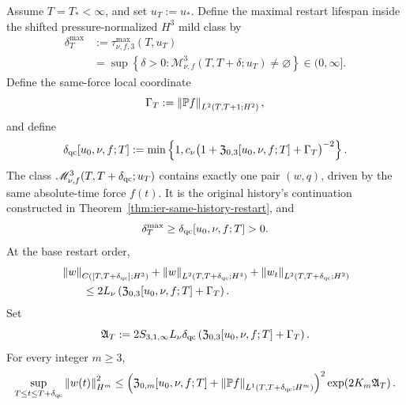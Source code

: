 \begin{theorem}
\label{thm:qc-restart}
Assume \(T=T_*<\infty\), and set \(u_T:=u_*\).
Define the maximal restart lifespan inside the shifted pressure-normalized
\(H^3\) mild class by
\begin{equation}
 \begin{aligned}
 \delta_T^{\max}
 &:=\tau_{\nu,f,3}^{\max}(T,u_T)\\
 &=\sup\left\{\delta>0:
 \mathscr M_{\nu,f}^3(T,T+\delta;u_T)\ne\varnothing\right\}
 \in(0,\infty].
 \end{aligned}
 \label{eq:qc-maximal-restart-lifespan-definition}
\end{equation}
Define the same-force local coordinate
\[
 \Gamma_T:=\left\lVert \mathbb P f\right\rVert_{L^2(T,T+1;H^2)},
\]
and define
\begin{equation}
 \delta_{\rm qc}[u_0,\nu,f;T]
 :=\min\left\{
 1,
 c_\nu\bigl(1+\mathfrak Z_{0,3}[u_0,\nu,f;T]+\Gamma_T\bigr)^{-2}
 \right\}.
 \label{eq:qc-restart-lifespan}
\end{equation}
The class \(\mathscr M_{\nu,f}^3(T,T+\delta_{\rm qc};u_T)\) contains exactly one
pair \((w,q)\), driven by the same absolute-time force \(f(t)\).  It is the original history's continuation constructed in
Theorem~\ref{thm:ier-same-history-restart}, and
\begin{equation}
 \delta_T^{\max}\ge\delta_{\rm qc}[u_0,\nu,f;T]>0.
 \label{eq:qc-restart-lower-bound}
\end{equation}
At the base restart order,
\begin{align}
 &\left\lVert w\right\rVert_{C([T,T+\delta_{\rm qc}];H^3)}
 +\left\lVert w\right\rVert_{L^2(T,T+\delta_{\rm qc};H^4)}
 +\left\lVert w_t\right\rVert_{L^2(T,T+\delta_{\rm qc};H^2)}
 \notag\\
 &\qquad\le2L_\nu\left(\mathfrak Z_{0,3}[u_0,\nu,f;T]+\Gamma_T\right).
 \label{eq:qc-restart-base-size}
\end{align}
Set
\begin{equation}
 \mathfrak A_T
 :=2S_{3,1,\infty}L_\nu\delta_{\rm qc}
 \left(\mathfrak Z_{0,3}[u_0,\nu,f;T]+\Gamma_T\right).
 \label{eq:qc-restart-action}
\end{equation}
For every integer \(m\ge3\),
\begin{equation}
 \sup_{T\le t\le T+\delta_{\rm qc}}\left\lVert w(t)\right\rVert_{H^m}^2
 \le\left(
 \mathfrak Z_{0,m}[u_0,\nu,f;T]
 +\left\lVert \mathbb P f\right\rVert_{L^1(T,T+\delta_{\rm qc};H^m)}
 \right)^2
 \exp\!\left(2K_m\mathfrak A_T\right).
 \label{eq:qc-restart-persistence-size}
\end{equation}
\end{theorem}

